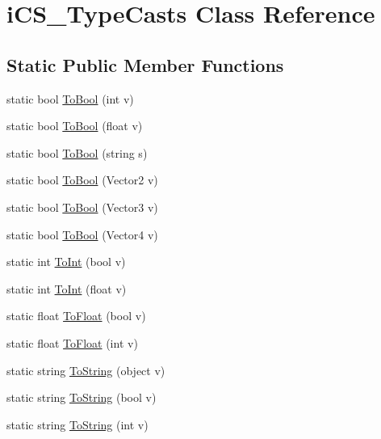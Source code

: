 \hypertarget{classi_c_s___type_casts}{\section{i\+C\+S\+\_\+\+Type\+Casts Class Reference}
\label{classi_c_s___type_casts}
}
\subsection*{Static Public Member Functions}
\begin{DoxyCompactItemize}
\item 
static bool \hyperlink{classi_c_s___type_casts_afe4f874629183e316f14cd7e30ea099d}{To\+Bool} (int v)
\item 
static bool \hyperlink{classi_c_s___type_casts_a61103a116dd88ddcb0e4f53a92175dd7}{To\+Bool} (float v)
\item 
static bool \hyperlink{classi_c_s___type_casts_ac05536474cbc2f68a2fffa4684b09b8d}{To\+Bool} (string s)
\item 
static bool \hyperlink{classi_c_s___type_casts_ae5950033d3de40b595d8026d09e7ee9a}{To\+Bool} (Vector2 v)
\item 
static bool \hyperlink{classi_c_s___type_casts_ad36995391cce11f7fcd4a67f5312ff28}{To\+Bool} (Vector3 v)
\item 
static bool \hyperlink{classi_c_s___type_casts_ac2d94ae8cdfe7c563286413e29ecacf6}{To\+Bool} (Vector4 v)
\item 
static int \hyperlink{classi_c_s___type_casts_adebf554e8e5665f835a559389e51b66f}{To\+Int} (bool v)
\item 
static int \hyperlink{classi_c_s___type_casts_a8e1551731cfc3cd5ff8f5d86eeb77f36}{To\+Int} (float v)
\item 
static float \hyperlink{classi_c_s___type_casts_a41533efff871479053adff182befe7c3}{To\+Float} (bool v)
\item 
static float \hyperlink{classi_c_s___type_casts_a920e8f227b807d4425577d8b982c0317}{To\+Float} (int v)
\item 
static string \hyperlink{classi_c_s___type_casts_abbfde2d268722f8e5d1512bd87afd852}{To\+String} (object v)
\item 
static string \hyperlink{classi_c_s___type_casts_ae152f0b5c43643e1ee8dfa1cd830a5a6}{To\+String} (bool v)
\item 
static string \hyperlink{classi_c_s___type_casts_a17c6150309812ef1ce006098f930991c}{To\+String} (int v)
\item 

\end{DoxyCompactItemize}
